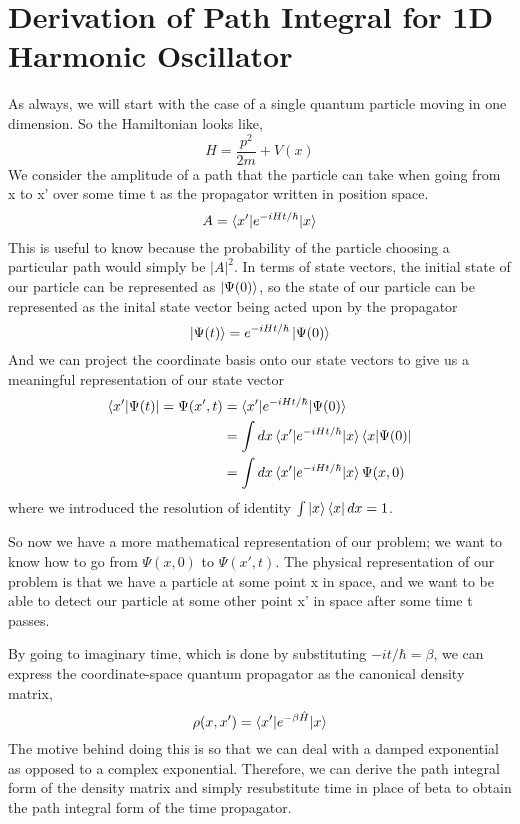 \documentclass{article}
\title{}
\date{11/14/19}
\author{Alan Robledo}
\newcommand{\be}{\begin{equation}}
\newcommand{\ee}{\end{equation}}
\begin{document}
\maketitle

\section{Derivation of Path Integral for 1D Harmonic Oscillator}
As always, we will start with the case of a single quantum particle moving in one dimension. So the Hamiltonian looks like,
\be
  H = \frac{p^2}{2m} + V(x)
\ee
We consider the amplitude of a path that the particle can take when going from x to x' over some time t as the propagator written in position space.
\be
  A = \braket{x'|e^{-iHt/\hbar}|x}
\ee
This is useful to know because the probability of the particle choosing a particular path would simply be $|A|^2$.
In terms of state vectors, the initial state of our particle can be represented as $\ket{\Psi(0)}$, so the state of our particle can be represented as the inital state vector being acted upon by the propagator
\be
  \ket{\Psi(t)} = e^{-iHt/\hbar} \ket{\Psi(0)}
\ee
And we can project the coordinate basis onto our state vectors to give us a meaningful representation of our state vector
\be
  \begin{split}
    \bra{x'|\Psi(t)} = \Psi(x',t) &= \braket{x'|e^{-iHt/\hbar}|\Psi(0)} \\
    &= \int dx \braket{x'|e^{-iHt/\hbar}|x} \bra{x|\Psi(0)} \\
    &= \int dx \braket{x'|e^{-iHt/\hbar}|x} \Psi(x,0)
  \end{split}
\ee
where we introduced the resolution of identity $\int \ket{x} \bra{x} dx = 1$.

So now we have a more mathematical representation of our problem; we want to know how to go from $\Psi(x,0)$ to $\Psi(x',t)$.
The physical representation of our problem is that we have a particle at some point x in space, and we want to be able to detect our particle at some other point x' in space after some time t passes.

By going to imaginary time, which is done by substituting $-it/\hbar = \beta$, we can express the coordinate-space quantum propagator as the canonical density matrix,
\be \label{eq:density_mat}
  \rho(x,x') = \braket{x'|e^{-\beta \hat{H}}| x}
\ee
The motive behind doing this is so that we can deal with a damped exponential as opposed to a complex exponential.
Therefore, we can derive the path integral form of the density matrix and simply resubstitute time in place of beta to obtain the path integral form of the time propagator.
\end{document}
